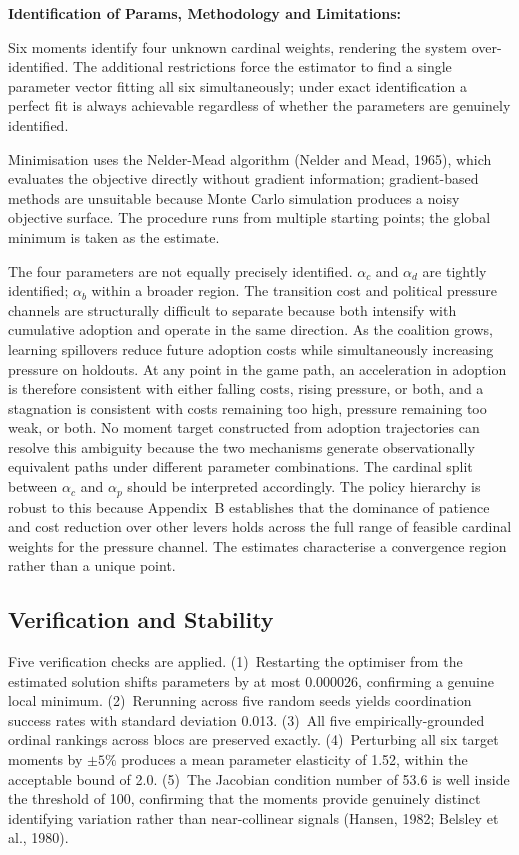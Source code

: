 \documentclass[10pt,a4paper]{article}
\newcommand{\bpar}[1]{\medskip\noindent\textbf{#1}\par}
\begin{document}
\bpar{Identification of Params, Methodology and Limitations:}

Six moments identify four unknown cardinal weights, rendering the system over-identified. The additional restrictions force the estimator to find a single parameter vector fitting all six simultaneously; under exact identification a perfect fit is always achievable regardless of whether the parameters are genuinely identified.

Minimisation uses the Nelder-Mead algorithm (Nelder and Mead, 1965), which evaluates the objective directly without gradient information; gradient-based methods are unsuitable because Monte Carlo simulation produces a noisy objective surface. The procedure runs from multiple starting points; the global minimum is taken as the estimate.

The four parameters are not equally precisely identified. $\alpha_c$ and $\alpha_d$ are tightly identified; $\alpha_b$ within a broader region. The transition cost and political pressure channels are structurally difficult to separate because both intensify with cumulative adoption and operate in the same direction. As the coalition grows, learning spillovers reduce future adoption costs while simultaneously increasing pressure on holdouts. At any point in the game path, an acceleration in adoption is therefore consistent with either falling costs, rising pressure, or both, and a stagnation is consistent with costs remaining too high, pressure remaining too weak, or both. No moment target constructed from adoption trajectories can resolve this ambiguity because the two mechanisms generate observationally equivalent paths under different parameter combinations. The cardinal split between $\alpha_c$ and $\alpha_p$ should be interpreted accordingly. The policy hierarchy is robust to this because Appendix~B establishes that the dominance of patience and cost reduction over other levers holds across the full range of feasible cardinal weights for the pressure channel. The estimates characterise a convergence region rather than a unique point.


\FloatBarrier

\needspace{12em}
\subsection{Verification and Stability}

Five verification checks are applied. (1)~Restarting the optimiser from the estimated solution shifts parameters by at most 0.000026, confirming a genuine local minimum. (2)~Rerunning across five random seeds yields coordination success rates with standard deviation 0.013. (3)~All five empirically-grounded ordinal rankings across blocs are preserved exactly. (4)~Perturbing all six target moments by $\pm5\%$ produces a mean parameter elasticity of 1.52, within the acceptable bound of 2.0. (5)~The Jacobian condition number of 53.6 is well inside the threshold of 100, confirming that the moments provide genuinely distinct identifying variation rather than near-collinear signals (Hansen, 1982; Belsley et al., 1980).
\end{document}
